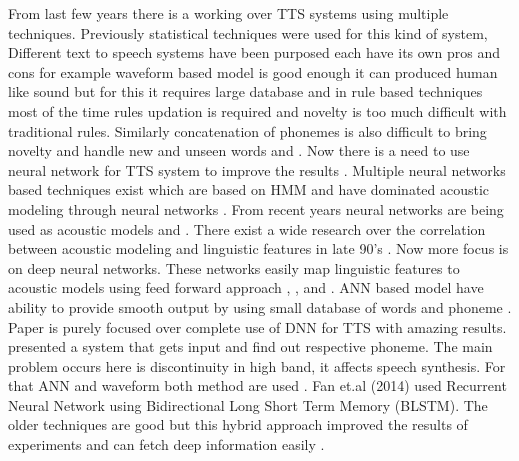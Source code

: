 From last few years there is a working over TTS systems using multiple techniques. Previously statistical techniques were
used for this kind of system, Different text to speech systems have been purposed each have its own pros and cons for
example waveform based model is good enough it can produced human like sound but for this it requires large database and
in rule based techniques most of the time rules updation is required and novelty is too much difficult with traditional rules.
Similarly concatenation of phonemes is also difficult to bring novelty and handle new and unseen words \cite{karaali1998text} and \cite{pitrelli2004tobi}. 
Now there is a need to use neural network for TTS system to improve the results \cite{muthukumar2016recurrent}. 
Multiple neural networks based techniques exist which are based on HMM and have dominated acoustic
modeling through neural networks \cite{tokuda2013speech}. From recent years neural networks are being used as acoustic models \cite{ling2015deep} and \cite{zen2015acoustic}. 
There exist a wide research over the correlation between acoustic modeling and linguistic
features in late 90's \cite{cawley1993lsp}. Now more focus is on deep neural networks. These
networks easily map linguistic features to acoustic models using feed forward approach \cite{lu2013combining}, \cite{qian2014training}, \cite{chen2015deep} and 
\cite{ze2013statistical}. ANN based model have
ability to provide smooth output by using small database of words and phoneme \cite{ganai2016text}. Paper \cite{muthukumar2016recurrent} 
is purely focused over complete use of DNN for TTS with amazing results. \cite{ganai2016text} presented a system that gets input and find out 
respective phoneme. The main problem
occurs here is discontinuity in high band, it affects speech synthesis. For that ANN and waveform both method are used \cite{ganai2016text}. 
Fan et.al (2014) used Recurrent Neural Network using Bidirectional Long Short Term Memory
(BLSTM). The older techniques are good but this hybrid approach improved the results of experiments and can fetch deep
information easily \cite{fan2014tts}.